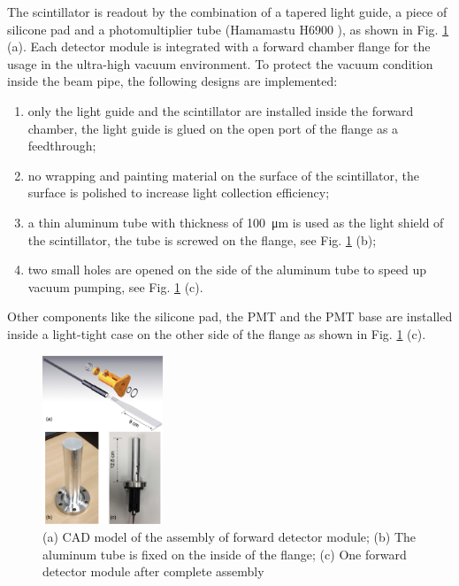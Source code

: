 \documentclass[number,5p]{elsarticle}
\begin{document}
The scintillator is readout by the combination of a tapered light guide, a piece of silicone pad and a
photomultiplier tube (Hamamastu H6900 \cite{hamamatsu}), as shown in Fig. \ref{fig:forward_module} (a).
Each detector module is integrated with a forward chamber flange for the usage
in the ultra-high vacuum environment.
To protect the vacuum condition inside the beam pipe, the following designs are implemented:
\begin{enumerate}
\item only the light guide and the scintillator are installed inside the forward chamber, the light guide is glued on the open port of the flange as a feedthrough;
\item no wrapping and painting material on the surface of the scintillator, the surface is polished to increase light collection efficiency;
\item a thin aluminum tube with thickness of \SI{100}{\micro\meter} is used as
  the light shield of the scintillator, the tube is screwed on the flange, see Fig. \ref{fig:forward_module} (b);
\item two small holes are opened on the side of the aluminum tube to speed up vacuum pumping, see Fig. \ref{fig:forward_module} (c).
\end{enumerate}
Other components like the silicone pad, the PMT and the PMT base are installed inside a light-tight case on the other side of the flange as shown in Fig. \ref{fig:forward_module} (c).
\begin{figure}[htbp]
  \centering
  \includegraphics[width=0.32\textwidth]{./forward_module.png}
  \caption{(a) CAD model of the assembly of forward detector module; (b) The aluminum tube is fixed on the inside of the flange; (c) One forward detector module after complete assembly}
  \label{fig:forward_module}
\end{figure}
\end{document}

